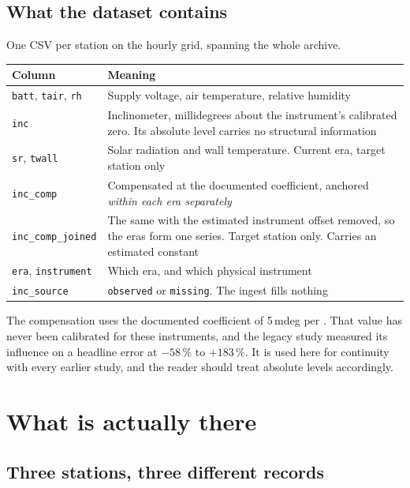 \documentclass[11pt,a4paper]{article}
\begin{document}
\subsection{What the dataset contains}

One CSV per station on the hourly grid, spanning the whole archive.

\begin{center}
\small
\begin{tabularx}{\textwidth}{L{3.4cm}Y}
\toprule
\textbf{Column} & \textbf{Meaning} \\
\midrule
\texttt{batt}, \texttt{tair}, \texttt{rh} & Supply voltage, air temperature,
relative humidity \\
\texttt{inc} & Inclinometer, millidegrees about the instrument's calibrated
zero. Its absolute level carries no structural information \\
\texttt{sr}, \texttt{twall} & Solar radiation and wall temperature. Current era,
target station only \\
\texttt{inc\_comp} & Compensated at the documented coefficient, anchored
\emph{within each era separately} \\
\texttt{inc\_comp\_joined} & The same with the estimated instrument offset
removed, so the eras form one series. Target station only. Carries an estimated
constant \\
\texttt{era}, \texttt{instrument} & Which era, and which physical instrument \\
\texttt{inc\_source} & \texttt{observed} or \texttt{missing}. The ingest fills
nothing \\
\bottomrule
\end{tabularx}
\end{center}

The compensation uses the documented coefficient of 5\,mdeg per \degC. That
value has never been calibrated for these instruments, and the legacy study
measured its influence on a headline error at $-58$\,\% to $+183$\,\%. It is
used here for continuity with every earlier study, and the reader should treat
absolute levels accordingly.

\section{What is actually there}
\label{sec:present}

\subsection{Three stations, three different records}
\end{document}
